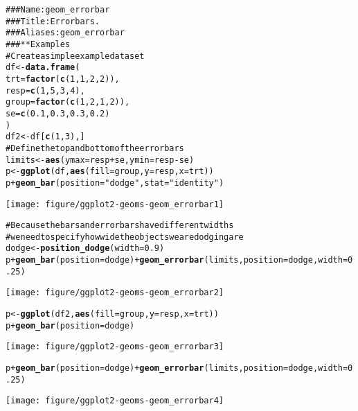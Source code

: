 \documentclass[a4paper,titlepage]{tufte-handout}\usepackage{graphicx, color}
\makeatletter
\def\maxwidth{ %
  \ifdim\Gin@nat@width>\linewidth
    \linewidth
  \else
    \Gin@nat@width
  \fi
}
\newcommand{\hlfunctioncall}[1]{\textcolor[rgb]{0.501960784313725,0,0.329411764705882}{\textbf{#1}}}%
\newcommand{\hlstring}[1]{\textcolor[rgb]{0.6,0.6,1}{#1}}%
\newcommand{\hlcomment}[1]{\textcolor[rgb]{0.180392156862745,0.6,0.341176470588235}{#1}}%
\newenvironment{kframe}{%
 \def\at@end@of@kframe{}%
 \ifinner\ifhmode%
  \def\at@end@of@kframe{\end{minipage}}%
  \begin{minipage}{\columnwidth}%
 \fi\fi%
 \def\FrameCommand##1{\hskip\@totalleftmargin \hskip-\fboxsep
 \colorbox{shadecolor}{##1}\hskip-\fboxsep
     \hskip-\linewidth \hskip-\@totalleftmargin \hskip\columnwidth}%
 \MakeFramed {\advance\hsize-\width
   \@totalleftmargin\z@ \linewidth\hsize
   \@setminipage}}%
 {\par\unskip\endMakeFramed%
 \at@end@of@kframe}
\newenvironment{knitrout}{}{} %
\makeatother
\begin{document}
\begin{knitrout}
\color{fgcolor}\begin{kframe}
\begin{alltt}
\hlcomment{### Name: geom_errorbar}
\hlcomment{### Title: Error bars.}
\hlcomment{### Aliases: geom_errorbar}
\hlcomment{### ** Examples}
\hlcomment{# Create a simple example dataset}
df <- \hlfunctioncall{data.frame}(
  trt = \hlfunctioncall{factor}(\hlfunctioncall{c}(1, 1, 2, 2)),
  resp = \hlfunctioncall{c}(1, 5, 3, 4),
  group = \hlfunctioncall{factor}(\hlfunctioncall{c}(1, 2, 1, 2)),
  se = \hlfunctioncall{c}(0.1, 0.3, 0.3, 0.2)
)
df2 <- df[\hlfunctioncall{c}(1,3),]
\hlcomment{# Define the top and bottom of the errorbars}
limits <- \hlfunctioncall{aes}(ymax = resp + se, ymin=resp - se)
p <- \hlfunctioncall{ggplot}(df, \hlfunctioncall{aes}(fill=group, y=resp, x=trt))
p + \hlfunctioncall{geom_bar}(position=\hlstring{"dodge"}, stat=\hlstring{"identity"})
\end{alltt}
\end{kframe}\texttt{[image: figure/ggplot2-geoms-geom\_errorbar1]} \begin{kframe}\begin{alltt}
\hlcomment{# Because the bars and errorbars have different widths}
\hlcomment{# we need to specify how wide the objects we are dodging are}
dodge <- \hlfunctioncall{position_dodge}(width=0.9)
p + \hlfunctioncall{geom_bar}(position=dodge) + \hlfunctioncall{geom_errorbar}(limits, position=dodge, width=0.25)
\end{alltt}
\end{kframe}\texttt{[image: figure/ggplot2-geoms-geom\_errorbar2]} \begin{kframe}\begin{alltt}
p <- \hlfunctioncall{ggplot}(df2, \hlfunctioncall{aes}(fill=group, y=resp, x=trt))
p + \hlfunctioncall{geom_bar}(position=dodge)
\end{alltt}
\end{kframe}\texttt{[image: figure/ggplot2-geoms-geom\_errorbar3]} \begin{kframe}\begin{alltt}
p + \hlfunctioncall{geom_bar}(position=dodge) + \hlfunctioncall{geom_errorbar}(limits, position=dodge, width=0.25)
\end{alltt}
\end{kframe}\texttt{[image: figure/ggplot2-geoms-geom\_errorbar4]} \begin{kframe}\begin{alltt}

\end{alltt}
\end{kframe}
\end{knitrout}
\end{document}
